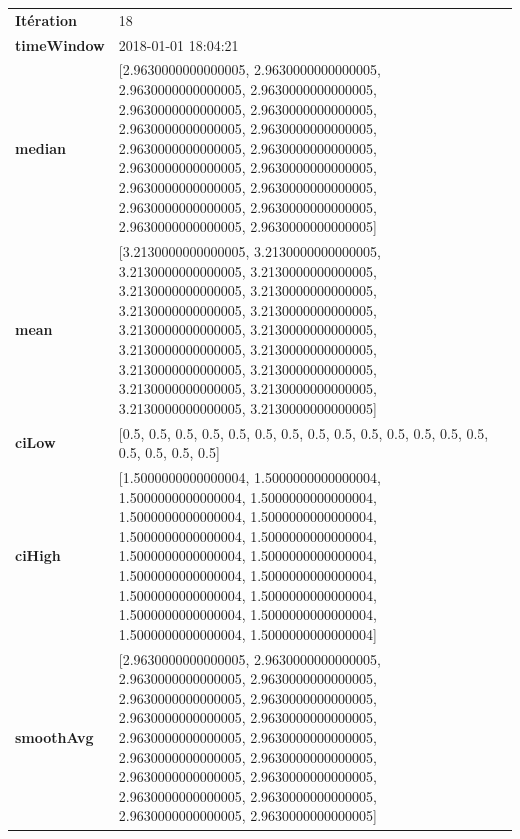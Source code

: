 \begin{table}[H]
	\centering
	\begin{tabularx}{\textwidth}{lX}
		\textbf{Itération}& 18 \\
		\textbf{timeWindow} &2018-01-01 18:04:21 \\
		
		\textbf{median}& [2.9630000000000005, 2.9630000000000005, 2.9630000000000005, 2.9630000000000005, 2.9630000000000005, 2.9630000000000005, 2.9630000000000005, 2.9630000000000005, 2.9630000000000005, 2.9630000000000005, 2.9630000000000005, 2.9630000000000005, 2.9630000000000005, 2.9630000000000005, 2.9630000000000005, 2.9630000000000005, 2.9630000000000005, 2.9630000000000005] \\
		\textbf{mean} & [3.2130000000000005, 3.2130000000000005, 3.2130000000000005, 3.2130000000000005, 3.2130000000000005, 3.2130000000000005, 3.2130000000000005, 3.2130000000000005, 3.2130000000000005, 3.2130000000000005, 3.2130000000000005, 3.2130000000000005, 3.2130000000000005, 3.2130000000000005, 3.2130000000000005, 3.2130000000000005, 3.2130000000000005, 3.2130000000000005] \\
		\textbf{ciLow}& [0.5, 0.5, 0.5, 0.5, 0.5, 0.5, 0.5, 0.5, 0.5, 0.5, 0.5, 0.5, 0.5, 0.5, 0.5, 0.5, 0.5, 0.5] \\
		\textbf{ciHigh}& [1.5000000000000004, 1.5000000000000004, 1.5000000000000004, 1.5000000000000004, 1.5000000000000004, 1.5000000000000004, 1.5000000000000004, 1.5000000000000004, 1.5000000000000004, 1.5000000000000004, 1.5000000000000004, 1.5000000000000004, 1.5000000000000004, 1.5000000000000004, 1.5000000000000004, 1.5000000000000004, 1.5000000000000004, 1.5000000000000004] \\
		\textbf{smoothAvg}&  [2.9630000000000005, 2.9630000000000005, 2.9630000000000005, 2.9630000000000005, 2.9630000000000005, 2.9630000000000005, 2.9630000000000005, 2.9630000000000005, 2.9630000000000005, 2.9630000000000005, 2.9630000000000005, 2.9630000000000005, 2.9630000000000005, 2.9630000000000005, 2.9630000000000005, 2.9630000000000005, 2.9630000000000005, 2.9630000000000005] \\
		
				\end{tabularx} 
			\end{table}
			

